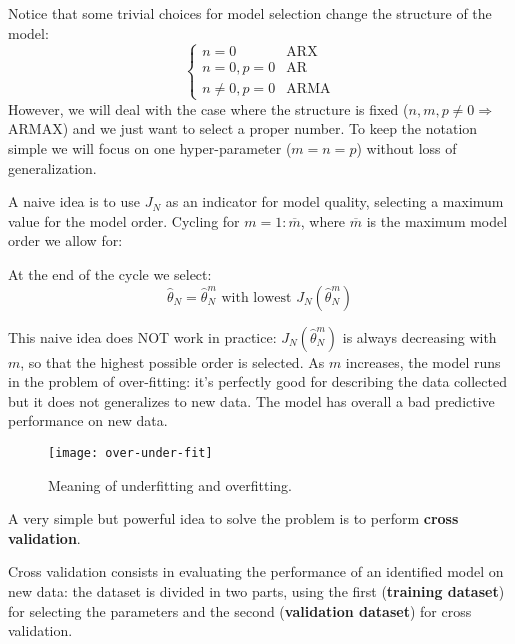 Notice that some trivial choices for model selection change the structure of the model:
\begin{equation*}
\begin{cases}
n=0 & \text{ARX}\\
n=0,p=0 & \text{AR}\\
n\neq 0,p=0 & \text{ARMA}
\end{cases}
\end{equation*}
However, we will deal with the case where the structure is fixed ($ n,m,p\neq 0\Longrightarrow$ ARMAX) and we just want to select a proper number. To keep the notation simple we will focus on one hyper-parameter ($ m=n=p$) without loss of generalization.

A naive idea is to use $ J_{N}$ as an indicator for model quality, selecting a maximum value for the model order. Cycling for $ m=1:\overline{m}$, where $\overline{m}$ is the maximum model order we allow for:


At the end of the cycle we select:
\begin{equation*}
\hat{\theta }_{N} =\hat{\theta }_{N}^{m} \text{ with lowest } J_{N}(\hat{\theta }_{N}^{m})
\end{equation*}
\begin{obs}
	This naive idea does NOT work in practice: $ J_{N}(\hat{\theta }_{N}^{m})$ is always decreasing with $ m$, so that the highest possible order is selected. As $m$ increases, the model runs in the problem of over-fitting: it's perfectly good for describing the data collected but it does not generalizes to new data. The model has overall a bad predictive performance on new data.
\end{obs}
\begin{figure}[htpb]
    \centering
    \texttt{[image: over-under-fit]}
    \caption{Meaning of underfitting and overfitting.}
\end{figure}
\FloatBarrier
A very simple but powerful idea to solve the problem is to perform \textbf{cross validation}.

Cross validation consists in evaluating the performance of an identified model on new data: the dataset is divided in two parts, using the first (\textbf{training dataset}) for selecting the parameters and the second (\textbf{validation dataset}) for cross validation.

